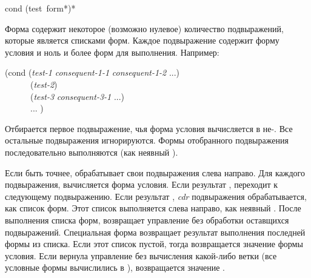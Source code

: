 \begin{defmac}
cond {(test {\,form}*)}*

Форма  содержит некоторое (возможно нулевое) количество подвыражений,
которые является списками форм.
Каждое подвыражение содержит форму условия и ноль и более форм для выполнения.
Например:
\begin{lisp}
(cond (\emph{test-1} \emph{consequent-1-1} \emph{consequent-1-2} ...) \\
~~~~~~(\emph{test-2}) \\
~~~~~~(\emph{test-3} \emph{consequent-3-1} ...) \\
~~~~~~... )
\end{lisp}

Отбирается первое подвыражение, чья форма условия вычисляется в не-{\false}. Все
остальные подвыражения игнорируются. Формы отобранного подвыражения
последовательно выполняются (как неявный ).

Если быть точнее,  обрабатывает свои подвыражения слева направо. Для
каждого подвыражения, вычисляется форма условия. Если результат {\false},
 переходит к следующему подвыражению. Если результат {\true},
\emph{cdr} подвыражения обрабатывается, как список форм. Этот список выполняется
слева направо, как неявный .
После выполнения списка форм,  возвращает управление без обработки
оставщихся подвыражений.
Специальная форма  возвращает результат выполнения последней формы из
списка. Если этот список пустой, тогда возвращается значение формы условия.
Если  вернула управление без вычисления какой-либо ветки (все условные
формы вычислились в {\false}), возвращается значение {\false}.


\end{defmac}

